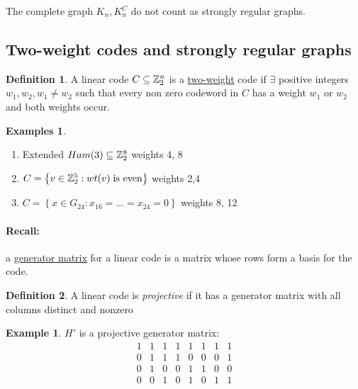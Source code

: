 \documentclass[]{article}
\theoremstyle{definition}
\newtheorem*{defn}{Definition}
\newtheorem*{exmp}{Example}
\newtheorem*{exmps}{Examples}
\theoremstyle{remark}
\numberwithin{equation}{section}
\begin{document}
		The complete graph $K_n, K_n^C$ do not count as strongly regular graphs. 
	\subsection{Two-weight codes and strongly regular graphs}
		\begin{defn}
			A linear code $C \subseteq \mathbb{Z}_2^n$ is a \underline{two-weight} code if $\exists$ positive integers $w_1, w_2, w_1 \neq w_2$ such that every non zero codeword in $C$ has a weight $w_1$ or $w_2$ and both weights occur.
		\end{defn}

		\begin{exmps}\hfill
			\begin{enumerate}
				\item Extended $Ham(3) \subseteq \mathbb{Z}_2^8$ weights 4, 8
				\item $C = \left\{v \in \mathbb{Z}_2^5 : wt(v)\; \text{is even} \right\}$ weights 2,4
				\item $C = \left\{ x \in G_{24} : x_{16} = \hdots = x_{24} = 0\right\}$ weights 8, 12
			\end{enumerate}
		\end{exmps}

		\paragraph*{Recall:} a \underline{generator matrix} for a linear code is a matrix whose rows form a basis for the code.

		\begin{defn}
			A linear code is \emph{projective} if it has a generator matrix with all columns distinct and nonzero
		\end{defn}

		\begin{exmp} $H'$ is a projective generator matrix:
		\[
			\begin{matrix}
				1 & 1 & 1 & 1 & 1 & 1 & 1 & 1\\
				0 & 1 & 1 & 1 & 0 & 0 & 0 & 1\\
				0 & 1 & 0 & 0 & 1 & 1 & 0 & 0\\
				0 & 0 & 1 & 0 & 1 & 0 & 1 & 1
			\end{matrix}
		\]
		\end{exmp}
\end{document}
